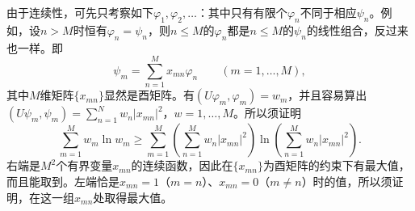 \documentclass[fontsize=13pt,twoside,openany,headings=normal,parskip=false,bookmarkpackage=false,DIV=calc]{scrbook}
\begin{document}
由于连续性，可先只考察如下$\varphi_1,\allowbreak \varphi_2,\allowbreak \ldots$：其中只有有限个$\varphi_n$不同于相应$\psi_n$。例如，设$n>M$时恒有$\varphi_n=\psi_n$，则$n\leq M$的$\varphi_n$都是$n\leq M$的$\psi_n$的线性组合，反过来也一样。即
\[
\psi_m=\sum_{n=1}^Mx_{mn}\varphi_n\qquad(m=1,\ldots,M),
\]
其中$M$维矩阵$\{x_{mn}\}$显然是酉矩阵。有$(U\varphi_m,\allowbreak \varphi_m)=w_m$，并且容易算出$(U\psi_m,\allowbreak \psi_m)=\sum_{n=1}^Nw_n|x_{mn}|^2$，$w=1,\allowbreak \ldots,\allowbreak M$。所以须证明
\[
\sum_{m=1}^Mw_m\ln w_m\geq
\sum_{m=1}^M\left(\sum_{n=1}^Mw_n|x_{mn}|^2\right)
\ln\left(\sum_{n=1}^Mw_n|x_{mn}|^2\right).
\]
右端是$M^2$个有界变量$x_{mn}$的连续函数，因此在$\{x_{mn}\}$为酉矩阵的约束下有最大值，而且能取到。左端恰是$x_{mn}=1$（$m=n$）、$x_{mn}=0$（$m\ne n$）时的值，所以须证明，在这一组$x_{mn}$处取得最大值。
\end{document}
